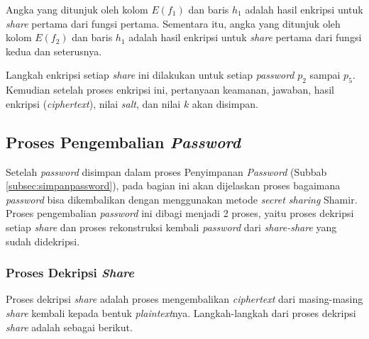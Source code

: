 Angka yang ditunjuk oleh kolom \begin{math}E(f_1)\end{math} dan baris \begin{math}h_1\end{math} adalah hasil enkripsi untuk \textit{share} pertama dari fungsi pertama. Sementara itu, angka yang ditunjuk oleh kolom \begin{math}E(f_2)\end{math} dan baris \begin{math}h_1\end{math} adalah hasil enkripsi untuk \textit{share} pertama dari fungsi kedua dan seterusnya.

Langkah enkripsi setiap \textit{share} ini dilakukan untuk setiap \textit{password} \begin{math}p_2\end{math} sampai \begin{math}p_5\end{math}. Kemudian setelah proses enkripsi ini, pertanyaan keamanan, jawaban, hasil enkripsi (\textit{ciphertext}), nilai \textit{salt}, dan nilai \begin{math}k\end{math} akan disimpan.

\subsection{Proses Pengembalian \textit{Password}}

Setelah \textit{password} disimpan dalam proses Penyimpanan \textit{Password} (Subbab \ref{subsec:simpanpassword}), pada bagian ini akan dijelaskan proses bagaimana \textit{password} bisa dikembalikan dengan menggunakan metode \textit{secret sharing} Shamir. Proses pengembalian \textit{password} ini dibagi menjadi 2 proses, yaitu proses dekripsi setiap \textit{share} dan proses rekonstruksi kembali \textit{password} dari \textit{share-share} yang sudah didekripsi.

\subsubsection{Proses Dekripsi \textit{Share}}

Proses dekripsi \textit{share} adalah proses mengembalikan \textit{ciphertext} dari masing-masing \textit{share} kembali kepada bentuk \textit{plaintext}nya. Langkah-langkah dari proses dekripsi \textit{share} adalah sebagai berikut.

